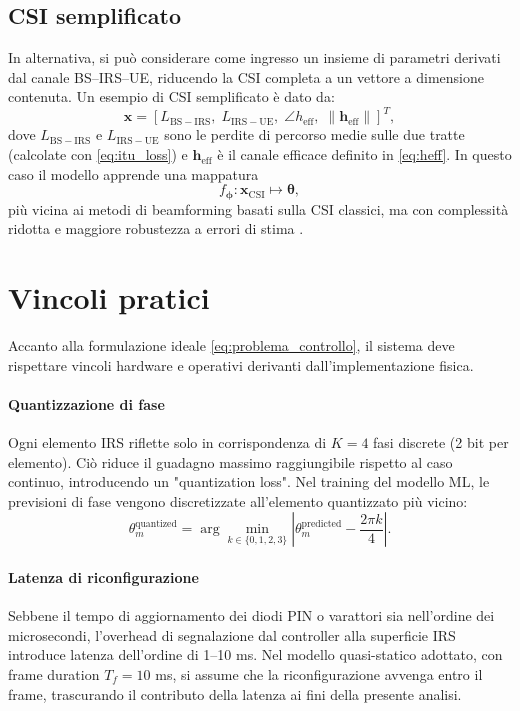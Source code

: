 \documentclass[12pt,a4paper]{report}
\begin{document}
\subsection{CSI semplificato}
In alternativa, si può considerare come ingresso un insieme di
parametri derivati dal canale BS--IRS--UE, riducendo la CSI completa
a un vettore a dimensione contenuta. Un esempio di CSI semplificato è dato da:
\[
  \mathbf{x} =
  \left[
    L_{\mathrm{BS-IRS}},\;
    L_{\mathrm{IRS-UE}},\;
    \angle h_{\mathrm{eff}},\;
    \|\mathbf{h}_{\mathrm{eff}}\|
  \right]^T,
\]
dove $L_{\mathrm{BS-IRS}}$ e $L_{\mathrm{IRS-UE}}$ sono le perdite di
percorso medie sulle due tratte (calcolate con \eqref{eq:itu_loss}) e
$\mathbf{h}_{\mathrm{eff}}$ è il canale efficace definito in
\eqref{eq:heff}. In questo caso il modello apprende una mappatura
\[
  f_{\boldsymbol{\phi}} : \mathbf{x}_{\mathrm{CSI}} \mapsto \boldsymbol{\theta},
\]
più vicina ai metodi di beamforming basati sulla CSI classici, ma con
complessità ridotta e maggiore robustezza a errori di stima
\cite{guo2021cascaded}.

\section{Vincoli pratici}
Accanto alla formulazione ideale \eqref{eq:problema_controllo}, il
sistema deve rispettare vincoli hardware e operativi derivanti
dall'implementazione fisica.

\paragraph{Quantizzazione di fase}
Ogni elemento IRS riflette solo in corrispondenza di $K = 4$ fasi
discrete (2 bit per elemento). Ciò riduce il guadagno massimo
raggiungibile rispetto al caso continuo, introducendo un
"quantization loss". Nel training del modello ML, le previsioni di
fase vengono discretizzate all'elemento quantizzato più vicino:
\begin{equation}
  \theta_m^{\text{quantized}} = \arg\min_{k \in \{0, 1, 2, 3\}}
  \left| \theta_m^{\text{predicted}} - \frac{2\pi k}{4} \right|.
\end{equation}

\paragraph{Latenza di riconfigurazione}
Sebbene il tempo di aggiornamento dei diodi PIN o varattori sia
nell'ordine dei microsecondi, l'overhead di segnalazione dal
controller alla superficie IRS introduce latenza dell'ordine di 1--10
ms. Nel modello quasi-statico adottato, con frame duration $T_f = 10$
ms, si assume che la riconfigurazione avvenga entro il frame,
trascurando il contributo della latenza ai fini della presente analisi.
\end{document}
